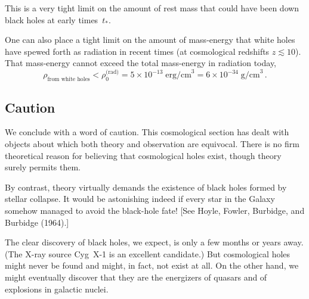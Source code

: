 This is a very tight limit on the amount of rest mass that could have been down
black holes at early times~$t_*$.

One can also place a tight limit on the amount of mass-energy that white holes
have spewed forth as radiation in recent times (at cosmological redshifts $z \lesssim 10$).
That mass-energy cannot exceed the total mass-energy in radiation today,
%
\begin{equation}
\tag{6.3.4}
\rho_{\text{from white holes}} < \rho_0^{\text{(rad)}}
= 5 \times 10^{-13}\;\text{erg/cm}^3
= 6 \times 10^{-34}\;\text{g/cm}^3\,.
\end{equation}


\subsection{Caution}
\label{sec:6.4}

We conclude with a word of caution.  This cosmological section has dealt with
objects about which both theory and observation are equivocal.  There is no firm
theoretical reason for believing that cosmological holes exist, though theory
surely permits them.

By contrast, theory virtually demands the existence of black holes formed
by stellar collapse.  It would be astonishing indeed if every star in the Galaxy
somehow managed to avoid the black-hole fate!  [See Hoyle, Fowler, Burbidge,
and Burbidge (1964).]

The clear discovery of black holes, we expect, is only a few months or years
away.  (The X-ray source Cyg~X-1 is an excellent candidate.)  But cosmological
holes might never be found and might, in fact, not exist at all.  On the other
hand, we might eventually discover that they are the energizers of quasars and
of explosions in galactic nuclei.


